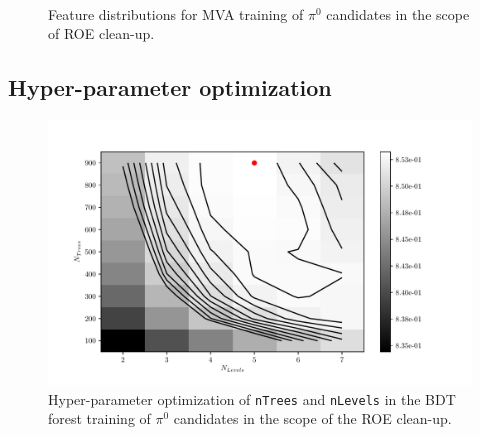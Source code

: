 \documentclass[headings=standardclasses,headings=big,oneside,a4paper,openany,12pt]{scrbook}
\begin{document}
\begin{figure}
\\
\caption{Feature distributions for MVA training of $\pi^0$ candidates in the scope of ROE clean-up.}
\end{figure}

\subsection*{Hyper-parameter optimization}

\begin{figure}[H]
\centering
\captionsetup{width=0.8\linewidth}
\includegraphics[width=\linewidth]{fig/addendums/pi0_hpo}
\caption{Hyper-parameter optimization of \texttt{nTrees} and \texttt{nLevels} in the BDT forest training of $\pi^0$ candidates in the scope of the ROE clean-up.}
\end{figure}
\end{document}
